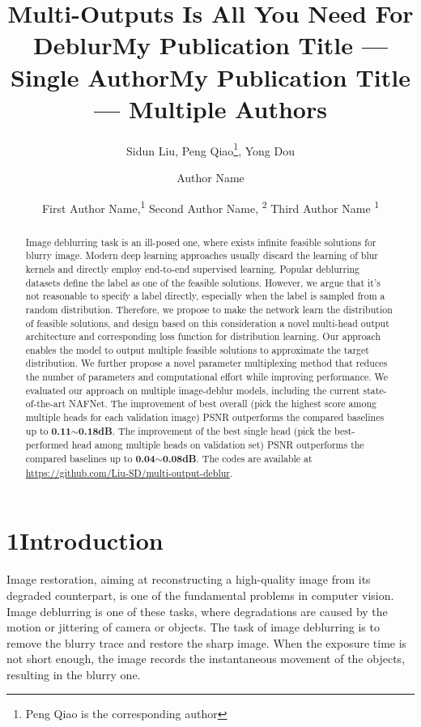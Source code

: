 \documentclass[letterpaper]{article} \usepackage{aaai23}  \usepackage{times}  \usepackage{helvet}  \usepackage{courier}  \usepackage[hyphens]{url}  \usepackage{graphicx} \urlstyle{rm} \def\UrlFont{\rm}  \usepackage{natbib}  \usepackage{caption} \frenchspacing  \setlength{\pdfpagewidth}{8.5in} \setlength{\pdfpageheight}{11in} \usepackage{algorithm}
\title{Multi-Outputs Is All You Need For Deblur}
\author{
Sidun Liu,
    Peng Qiao\footnote{Peng Qiao is the corresponding author},
    Yong Dou
}
\title{My Publication Title --- Single Author}
\author {
    Author Name
}
\title{My Publication Title --- Multiple Authors}
\author {
First Author Name,\textsuperscript{\rm 1}
    Second Author Name, \textsuperscript{\rm 2}
    Third Author Name \textsuperscript{\rm 1}
}
\begin{document}
\maketitle

\begin{abstract}
Image deblurring task is an ill-posed one, where exists infinite feasible solutions for blurry image. Modern deep learning approaches usually discard the learning of blur kernels and directly employ end-to-end supervised learning. Popular deblurring datasets define the label as one of the feasible solutions. However, we argue that it's not reasonable to specify a label directly, especially when the label is sampled from a random distribution. Therefore, we propose to make the network learn the distribution of feasible solutions, and design based on this consideration a novel multi-head output architecture and corresponding loss function for distribution learning. Our approach enables the model to output multiple feasible solutions to approximate the target distribution. We further propose a novel parameter multiplexing method that reduces the number of parameters and computational effort while improving performance. We evaluated our approach on multiple image-deblur models, including the current state-of-the-art NAFNet. The improvement of best overall (pick the highest score among multiple heads for each validation image) PSNR outperforms the compared baselines up to \textbf{0.11$\sim$0.18dB}. The improvement of the best single head (pick the best-performed head among multiple heads on validation set) PSNR outperforms the compared baselines up to \textbf{0.04$\sim$0.08dB}. The codes are available at \href{https://github.com/Liu-SD/multi-output-deblur}{https://github.com/Liu-SD/multi-output-deblur}.
\end{abstract}

\section{1\quad Introduction}

Image restoration, aiming at reconstructing a high-quality image from its degraded counterpart, is one of the fundamental problems in computer vision. Image deblurring is one of these tasks, where degradations are caused by the motion or jittering of camera or objects. The task of image deblurring is to remove the blurry trace and restore the sharp image. When the exposure time is not short enough, the image records the instantaneous movement of the objects, resulting in the blurry one. 
\end{document}
